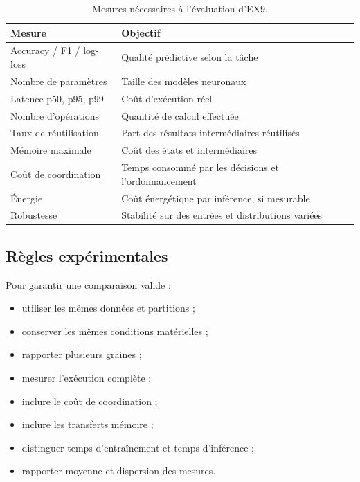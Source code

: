 \documentclass[11pt,a4paper]{article}
\begin{document}
\begin{table}[H]
\centering
\small
\begin{tabularx}{\textwidth}{p{3.0cm}X}
\toprule
Mesure & Objectif \\
\midrule
Accuracy / F1 / log-loss
& Qualité prédictive selon la tâche \\

Nombre de paramètres
& Taille des modèles neuronaux \\

Latence p50, p95, p99
& Coût d'exécution réel \\

Nombre d'opérations
& Quantité de calcul effectuée \\

Taux de réutilisation
& Part des résultats intermédiaires réutilisés \\

Mémoire maximale
& Coût des états et intermédiaires \\

Coût de coordination
& Temps consommé par les décisions et l'ordonnancement \\

Énergie
& Coût énergétique par inférence, si mesurable \\

Robustesse
& Stabilité sur des entrées et distributions variées \\
\bottomrule
\end{tabularx}
\caption{Mesures nécessaires à l'évaluation d'EX9.}
\end{table}

\subsection{Règles expérimentales}

Pour garantir une comparaison valide :
\begin{itemize}
  \item utiliser les mêmes données et partitions ;
  \item conserver les mêmes conditions matérielles ;
  \item rapporter plusieurs graines ;
  \item mesurer l'exécution complète ;
  \item inclure le coût de coordination ;
  \item inclure les transferts mémoire ;
  \item distinguer temps d'entraînement et temps d'inférence ;
  \item rapporter moyenne et dispersion des mesures.
\end{itemize}
\end{document}
